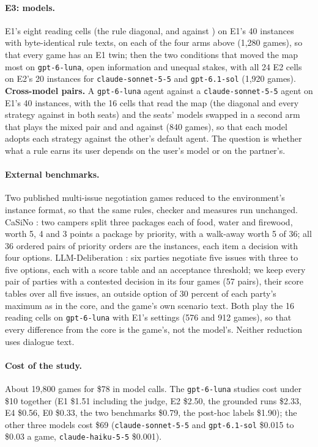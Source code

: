 \paragraph{E3: models.} E1's eight reading cells (the rule diagonal, \competing{} and \collaborating{} against \neutral) on E1's 40 instances with byte-identical rule texts, on each of the four arms above (1{,}280 games), so that every game has an E1 twin; then the two conditions that moved the map most on \texttt{gpt-6-luna}, open information and unequal stakes, with all 24 E2 cells on E2's 20 instances for \texttt{claude-sonnet-5-5} and \texttt{gpt-6.1-sol} (1{,}920 games). \textbf{Cross-model pairs.} A \texttt{gpt-6-luna} agent against a \texttt{claude-sonnet-5-5} agent on E1's 40 instances, with the 16 cells that read the map (the diagonal and every strategy against \neutral{} in both seats) and the seats' models swapped in a second arm that plays the mixed \neutral{} pair and \competing{} and \collaborating{} against \neutral{} (840 games), so that each model adopts each strategy against the other's default agent. The question is whether what a rule earns its user depends on the user's model or on the partner's.

\paragraph{External benchmarks.} Two published multi-issue negotiation games reduced to the environment's instance format, so that the same rules, checker and measures run unchanged. CaSiNo \citep{chawla2021casino}: two campers split three packages each of food, water and firewood, worth 5, 4 and 3 points a package by priority, with a walk-away worth 5 of 36; all 36 ordered pairs of priority orders are the instances, each item a decision with four options. LLM-Deliberation \citep{abdelnabi2024cooperation}: six parties negotiate five issues with three to five options, each with a score table and an acceptance threshold; we keep every pair of parties with a contested decision in its four games (57 pairs), their score tables over all five issues, an outside option of 30 percent of each party's maximum as in the core, and the game's own scenario text. Both play the 16 reading cells on \texttt{gpt-6-luna} with E1's settings (576 and 912 games), so that every difference from the core is the game's, not the model's. Neither reduction uses dialogue text.

\paragraph{Cost of the study.} About 19{,}800 games for \$78 in model calls. The \texttt{gpt-6-luna} studies cost under \$10 together (E1 \$1.51 including the judge, E2 \$2.50, the grounded runs \$2.33, E4 \$0.56, E0 \$0.33, the two benchmarks \$0.79, the post-hoc labels \$1.90); the other three models cost \$69 (\texttt{claude-sonnet-5-5} and \texttt{gpt-6.1-sol} \$0.015 to \$0.03 a game, \texttt{claude-haiku-5-5} \$0.001).

